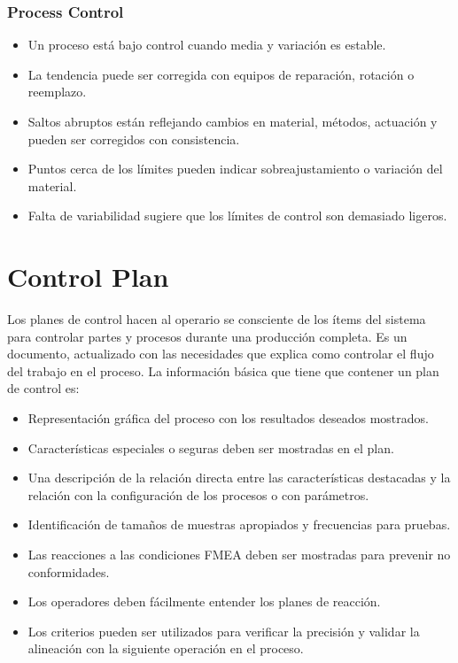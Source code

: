 \documentclass[]{article}
\begin{document}
\subsubsection{Process Control}
\begin{itemize}
	\item Un proceso está bajo control cuando media y variación es estable.
	\item La tendencia puede ser corregida con equipos de reparación, rotación o reemplazo.
	\item Saltos abruptos están reflejando cambios en material, métodos, actuación y pueden ser corregidos con consistencia.
	\item Puntos cerca de los límites pueden indicar sobreajustamiento o variación del material.
	\item Falta de variabilidad sugiere que los límites de control son demasiado ligeros.
\end{itemize}

\section{Control Plan}

Los planes de control hacen al operario se consciente de los ítems del sistema para controlar partes y procesos durante una producción completa. Es un documento, actualizado con las necesidades que explica como controlar el flujo del trabajo en el proceso. La información básica que tiene que contener un plan de control es:
\begin{itemize}
	\item Representación gráfica del proceso con los resultados deseados mostrados.
	\item Características especiales o seguras deben ser mostradas en el plan.
	\item Una descripción de la relación directa entre las características destacadas y la relación con la configuración de los procesos o con parámetros.
	\item Identificación de tamaños de muestras apropiados y frecuencias para pruebas.
	\item Las reacciones a las condiciones FMEA deben ser mostradas para prevenir no conformidades.
	\item Los operadores deben fácilmente entender los planes de reacción.
	\item Los criterios pueden ser utilizados para verificar la precisión y validar la alineación con la siguiente operación en el proceso.
\end{itemize}
\end{document}
